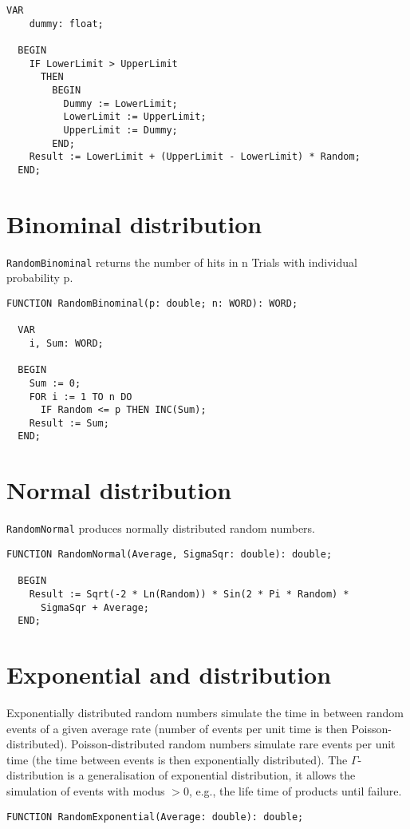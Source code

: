 \begin{refsection}
\begin{lstlisting}[caption=Laplace-distributed random numbers]
  VAR
    dummy: float;

  BEGIN
    IF LowerLimit > UpperLimit
      THEN
        BEGIN
          Dummy := LowerLimit;
          LowerLimit := UpperLimit;
          UpperLimit := Dummy;
        END;
    Result := LowerLimit + (UpperLimit - LowerLimit) * Random;
  END;
\end{lstlisting}

\section{Binominal distribution}

\texttt{RandomBinominal} returns the number of hits in n Trials with individual probability p.
\begin{lstlisting}[caption=Linear]
  FUNCTION RandomBinominal(p: double; n: WORD): WORD;

  VAR
    i, Sum: WORD;

  BEGIN
    Sum := 0;
    FOR i := 1 TO n DO
      IF Random <= p THEN INC(Sum);
    Result := Sum;
  END;
\end{lstlisting}

\section{Normal distribution}

\texttt{RandomNormal} produces normally distributed random numbers.
\begin{lstlisting}[caption=Normal]
  FUNCTION RandomNormal(Average, SigmaSqr: double): double;

  BEGIN
    Result := Sqrt(-2 * Ln(Random)) * Sin(2 * Pi * Random) *
      SigmaSqr + Average;
  END;
\end{lstlisting}

\section{Exponential and  distribution}

Exponentially distributed random numbers simulate the time in between random events of a given average rate (number of events per unit time is then Poisson-distributed).  Poisson-distributed random numbers simulate rare events per unit time (the time between events is then exponentially distributed). The \(\Gamma \)-distribution is a generalisation of exponential distribution, it allows the simulation of events with modus \(> 0 \), e.g., the life time of products until failure.
\begin{lstlisting}[caption=Exponential Poisson and Gamma]
  FUNCTION RandomExponential(Average: double): double;


\end{lstlisting}
\end{refsection}
